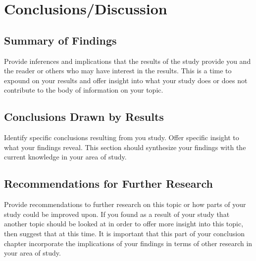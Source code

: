 \chapter{Conclusions/Discussion}

\section{Summary of Findings}
Provide inferences and implications that the results of the study provide you and the reader or others who may have interest in the results. This is a time to expound on your results and offer insight into what your study does or does not contribute to the body of information on your topic.

\section{Conclusions Drawn by Results}
Identify specific conclusions resulting from you study. Offer specific insight to what your findings reveal. This section should synthesize your findings with the current knowledge in your area of study.

\section{Recommendations for Further Research}
Provide recommendations to further research on this topic or how parts of your study could be improved upon. If you found as a result of your study that another topic should be looked at in order to offer more insight into this topic, then suggest that at this time. It is important that this part of your conclusion chapter incorporate the implications of your findings in terms of other research in your area of study.